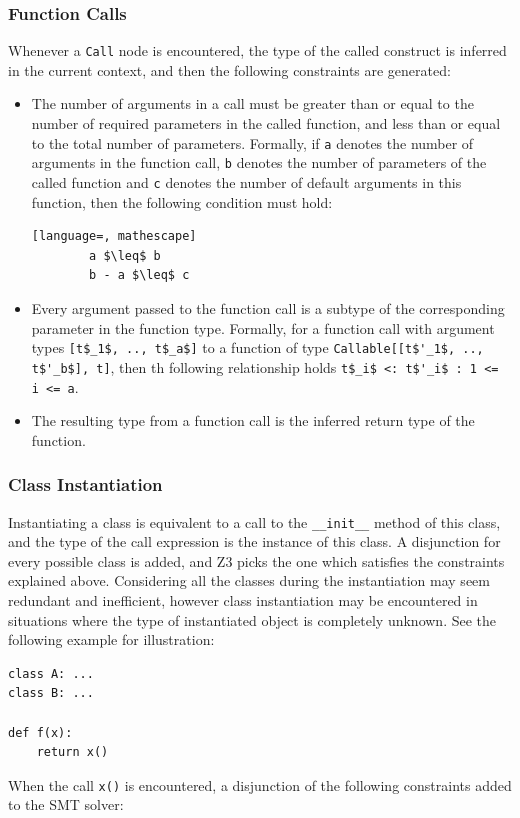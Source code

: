 \subsubsection{Function Calls}
Whenever a \lstinline|Call| node is encountered, the type of the called construct is inferred in the current context, and then the following constraints are generated:
\begin{itemize}
	\item The number of arguments in a call must be greater than or equal to the number of required parameters in the called function, and less than or equal to the total number of parameters. Formally, if \lstinline|a| denotes the number of arguments in the function call, \lstinline|b| denotes the number of parameters of the called function and \lstinline|c| denotes the number of default arguments in this function, then the following condition must hold:
	\begin{lstlisting}[language=, mathescape]
		a $\leq$ b
		b - a $\leq$ c
	\end{lstlisting}
	
	\item Every argument passed to the function call is a subtype of the corresponding parameter in the function type. Formally, for a function call with argument types \lstinline[mathescape]|[t$_1$, .., t$_a$]| to a function of type \lstinline[mathescape]|Callable[[t$'_1$, .., t$'_b$], t]|, then th following relationship holds \lstinline[mathescape]|t$_i$ <: t$'_i$ : 1 <= i <= a|.
	
	\item The resulting type from a function call is the inferred return type of the function.
\end{itemize}

\subsubsection{Class Instantiation}
Instantiating a class is equivalent to a call to the \lstinline|__init__| method of this class, and the type of the call expression is the instance of this class. A disjunction for every possible class is added, and Z3 picks the one which satisfies the constraints explained above. Considering all the classes during the instantiation may seem redundant and inefficient, however class instantiation may be encountered in situations where the type of instantiated object is completely unknown. See the following example for illustration:
\begin{lstlisting}
class A: ...
class B: ...

def f(x):
	return x()
\end{lstlisting}
When the call \lstinline|x()| is encountered, a disjunction of the following constraints added to the SMT solver:


